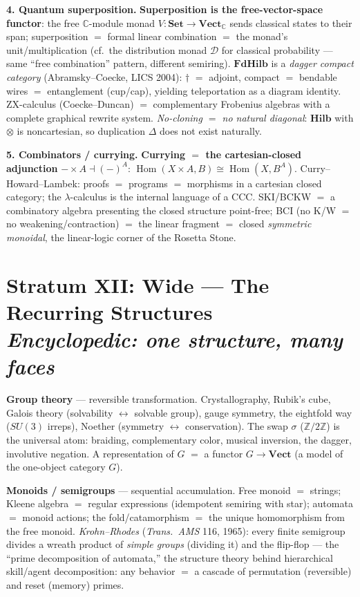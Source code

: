\documentclass[11pt]{article}
\theoremstyle{plain}
\theoremstyle{definition}
\theoremstyle{remark}
\newcommand{\Set}{\mathbf{Set}}
\newcommand{\Vect}{\mathbf{Vect}}
\newcommand{\Hilb}{\mathbf{Hilb}}
\newcommand{\FdHilb}{\mathbf{FdHilb}}
\newcommand{\Hom}{\operatorname{Hom}}
\newcommand{\stratum}[2]{\section{#1\\ {\normalsize\normalfont\itshape #2}}}
\begin{document}
\textbf{4. Quantum superposition.} \textbf{Superposition is the free-vector-space functor}: the free $\mathbb{C}$-module monad $V\colon \Set\to\Vect_\mathbb{C}$ sends classical states to their span; superposition $=$ formal linear combination $=$ the monad's unit/multiplication (cf.\ the distribution monad $\mathcal{D}$ for classical probability --- same ``free combination'' pattern, different semiring). $\FdHilb$ is a \emph{dagger compact category} (Abramsky--Coecke, LICS 2004): $\dagger$ $=$ adjoint, compact $=$ bendable wires $=$ entanglement (cup/cap), yielding teleportation as a diagram identity. ZX-calculus (Coecke--Duncan) $=$ complementary Frobenius algebras with a complete graphical rewrite system. \emph{No-cloning $=$ no natural diagonal}: $\Hilb$ with $\otimes$ is noncartesian, so duplication $\Delta$ does not exist naturally.

\textbf{5. Combinators / currying.} \textbf{Currying $=$ the cartesian-closed adjunction} ${-}\times A \dashv (-)^A$: $\Hom(X\times A,B)\cong \Hom(X,B^A)$. Curry--Howard--Lambek: proofs $=$ programs $=$ morphisms in a cartesian closed category; the $\lambda$-calculus is the internal language of a CCC. SKI/BCKW $=$ a combinatory algebra presenting the closed structure point-free; BCI (no K/W $=$ no weakening/contraction) $=$ the linear fragment $=$ closed \emph{symmetric monoidal}, the linear-logic corner of the Rosetta Stone.

\stratum{Stratum XII: Wide --- The Recurring Structures}{Encyclopedic: one structure, many faces}

\textbf{Group theory} --- reversible transformation. Crystallography, Rubik's cube, Galois theory (solvability $\leftrightarrow$ solvable group), gauge symmetry, the eightfold way ($SU(3)$ irreps), Noether (symmetry $\leftrightarrow$ conservation). The swap $\sigma$ ($\mathbb{Z}/2\mathbb{Z}$) is the universal atom: braiding, complementary color, musical inversion, the dagger, involutive negation. A representation of $G$ $=$ a functor $G\to\Vect$ (a model of the one-object category $G$).

\textbf{Monoids / semigroups} --- sequential accumulation. Free monoid $=$ strings; Kleene algebra $=$ regular expressions (idempotent semiring with star); automata $=$ monoid actions; the fold/catamorphism $=$ the unique homomorphism from the free monoid. \emph{Krohn--Rhodes} (\emph{Trans.\ AMS} 116, 1965): every finite semigroup divides a wreath product of \emph{simple groups} (dividing it) and the flip-flop --- the ``prime decomposition of automata,'' the structure theory behind hierarchical skill/agent decomposition: any behavior $=$ a cascade of permutation (reversible) and reset (memory) primes.
\end{document}
